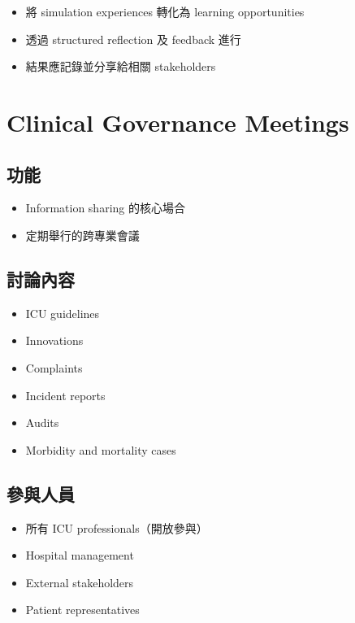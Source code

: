 \documentclass[12pt,a4paper]{article}
\begin{document}
\begin{itemize}
    \item 將 simulation experiences 轉化為 learning opportunities
    \item 透過 structured reflection 及 feedback 進行
    \item 結果應記錄並分享給相關 stakeholders
\end{itemize}

\section{Clinical Governance Meetings}

\subsection{功能}

\begin{itemize}
    \item Information sharing 的核心場合
    \item 定期舉行的跨專業會議
\end{itemize}

\subsection{討論內容}

\begin{itemize}
    \item ICU guidelines
    \item Innovations
    \item Complaints
    \item Incident reports
    \item Audits
    \item Morbidity and mortality cases
\end{itemize}

\subsection{參與人員}

\begin{itemize}
    \item 所有 ICU professionals（開放參與）
    \item Hospital management
    \item External stakeholders
    \item Patient representatives
\end{itemize}
\end{document}
